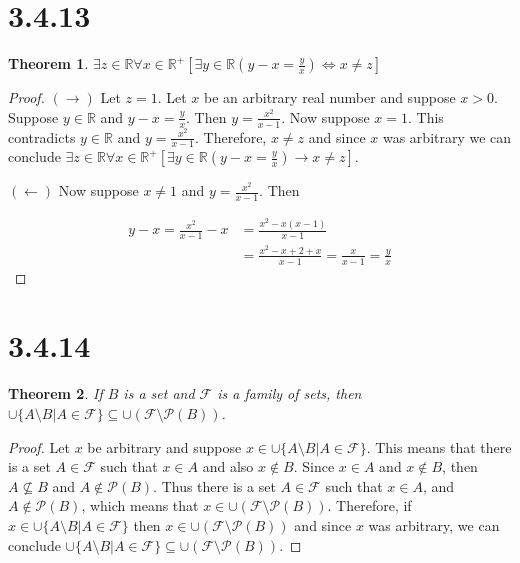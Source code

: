 \documentclass{article}
\newcommand{\F}{\mathcal{F}}
\newcommand{\pwset}{\mathscr{P}}
\newtheorem*{theorem}{Theorem}  %
\begin{document}
\section*{3.4.13}
\begin{theorem} $\exists z \in \mathbb{R} \forall x \in \mathbb{R}^+ [\exists y \in \mathbb{R} (y - x = \tfrac{y}{x}) \iff x \neq z]$
\end{theorem}
\begin{proof}
$(\rightarrow)$ Let $z = 1$. Let $x$ be an arbitrary real number and suppose $x > 0$. Suppose $y \in \mathbb{R}$ and $y - x = \tfrac{y}{x}$. Then $y = \tfrac{x^2}{x-1}$. Now suppose $x = 1$. This contradicts $y \in \mathbb{R}$ and $y = \tfrac{x^2}{x-1}$. Therefore, $x \neq z$ and since $x$ was arbitrary we can conclude $\exists z \in \mathbb{R} \forall x \in \mathbb{R}^+ [\exists y \in \mathbb{R} (y - x = \tfrac{y}{x}) \rightarrow x \neq z]$.

$(\leftarrow)$ Now suppose $x \neq 1$ and $y = \tfrac{x^2}{x-1}$. Then

\begin{align*}
y - x = \frac{x^2}{x-1} - x &= \frac{x^2 - x(x-1)}{x-1} \\
&= \frac{x^2-x+2+x}{x-1} = \frac{x}{x-1} = \frac{y}{x}
\end{align*}
\end{proof}

\section*{3.4.14}
\begin{theorem} If $B$ is a set and $\F$ is a family of sets, then $\cup \{A \setminus B | A \in \F\} \subseteq \cup (\F \setminus \pwset(B))$.
\end{theorem}
\begin{proof}
Let $x$ be arbitrary and suppose $x \in \cup\{A \setminus B | A \in \F\}$. This means that there is a set $A \in \F$ such that $x \in A$ and also $x \notin B$. Since $x \in A$ and $x \notin B$, then $A \not\subseteq B$ and $A \notin \pwset(B)$. Thus there is a set $A \in \F$ such that $x \in A$, and $A \notin \pwset(B)$, which means that $x \in \cup(\F \setminus \pwset(B))$. Therefore, if $x \in \cup \{A \setminus B | A \in \F\}$ then $x \in \cup(\F \setminus \pwset(B))$ and since $x$ was arbitrary, we can conclude $\cup \{ A \setminus B | A \in \F\} \subseteq \cup (\F \setminus \pwset (B))$.
\end{proof}
\end{document}
